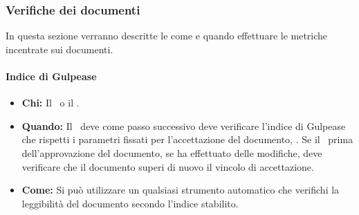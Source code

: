 \subsubsection{Verifiche dei documenti}
In questa sezione verranno descritte le come e quando effettuare le metriche incentrate sui documenti.

\paragraph{Indice di Gulpease}
\begin{itemize}
\item \textbf{Chi:} Il \Ver\ o il \Pm.
\item \textbf{Quando:} Il \Ver\ deve come passo successivo deve verificare l'indice di Gulpease che rispetti i parametri fissati per l'accettazione del documento, . Se il \Pm\ prima dell'approvazione del documento, se ha effettuato delle modifiche, deve verificare che il documento superi di nuovo il vincolo di accettazione.
\item \textbf{Come:} Si può utilizzare un qualsiasi strumento automatico che verifichi la leggibilità del documento secondo l'indice stabilito.
\end{itemize}